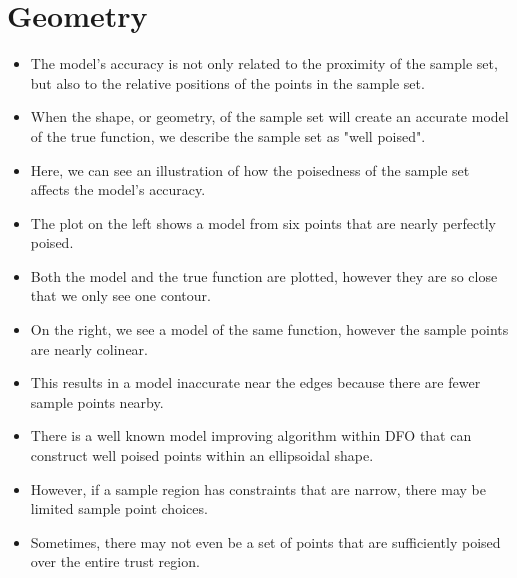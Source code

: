 \documentclass{article}
\begin{document}
	\section{Geometry}
\begin{itemize}
\item The model's accuracy is not only related to the proximity of the sample set, but also to the relative positions of the points in the sample set.
\item When the shape, or geometry, of the sample set will create an accurate model of the true function, we describe the sample set as "well poised".
\end{itemize}

\hrulefill

\begin{itemize}
\item Here, we can see an illustration of how the poisedness of the sample set affects the model's accuracy.
\item The plot on the left shows a model from six points that are nearly perfectly poised.
\item Both the model and the true function are plotted, however they are so close that we only see one contour.
\item On the right, we see a model of the same function, however the sample points are nearly colinear.
\item This results in a model inaccurate near the edges because there are fewer sample points nearby.
\end{itemize}

\hrulefill

\begin{itemize}
\item There is a well known model improving algorithm within DFO that can construct well poised points within an ellipsoidal shape.
\item However, if a sample region has constraints that are narrow, there may be limited sample point choices.
\item Sometimes, there may not even be a set of points that are sufficiently poised over the entire trust region.
\end{itemize}
\end{document}
